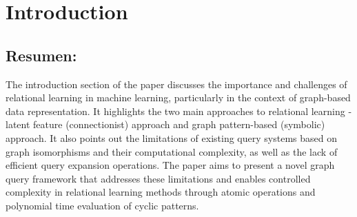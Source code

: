 \documentclass{article}%
\begin{document}
%
\normalsize%
\clearpage%
\section{Introduction}%
\label{sec:Introduction}%
\subsection{Resumen:}%
\label{subsec:Resumen}%
 The introduction section of the paper discusses the importance and challenges of relational learning in machine learning, particularly in the context of graph{-}based data representation. It highlights the two main approaches to relational learning {-} latent feature (connectionist) approach and graph pattern{-}based (symbolic) approach. It also points out the limitations of existing query systems based on graph isomorphisms and their computational complexity, as well as the lack of efficient query expansion operations. The paper aims to present a novel graph query framework that addresses these limitations and enables controlled complexity in relational learning methods through atomic operations and polynomial time evaluation of cyclic patterns.

%
\end{document}
